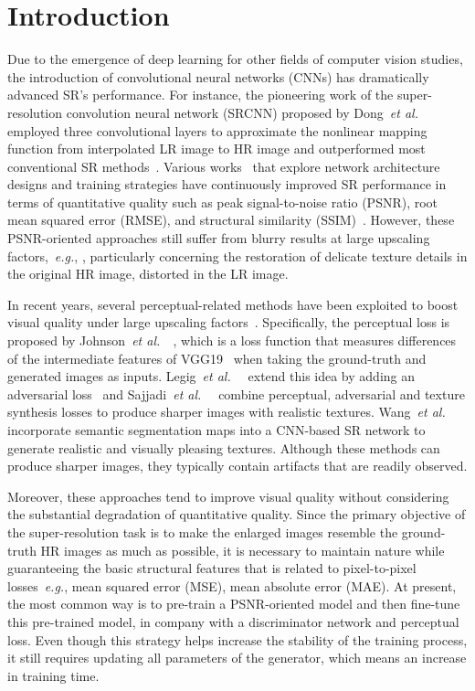 \documentclass[preprint]{elsarticle}
\newcommand{\etal}{\textit{et al.~}}
\newcommand{\eg}{\textit{e.g.}}
\begin{document}
\section{Introduction}

Due to the emergence of deep learning for other fields of computer vision studies, the introduction of convolutional neural networks (CNNs) has dramatically advanced SR's performance. For instance, the pioneering work of the super-resolution convolution neural network (SRCNN) proposed by Dong~\etal~\cite{SRCNN,SRCNN-Ex} employed three convolutional layers to approximate the nonlinear mapping function from interpolated LR image to HR image and outperformed most conventional SR methods~\cite{PCPE-MDSISR_IS16,Hadamard_IS18}. Various works~\cite{FSRCNN,VDSR,DRCN,ESPCN,DRRN,LapSRN,EDSR,MemNet,SRDenseNet,IDN,RDN,RCAN} that explore network architecture designs and training strategies have continuously improved SR performance in terms of quantitative quality such as peak signal-to-noise ratio (PSNR), root mean squared error (RMSE), and structural similarity (SSIM)~\cite{SSIM}. However, these PSNR-oriented approaches still suffer from blurry results at large upscaling factors,~\eg, , particularly concerning the restoration of delicate texture details in the original HR image, distorted in the LR image.

In recent years, several perceptual-related methods have been exploited to boost visual quality under large upscaling factors~\cite{Perceptual-loss,SRGAN,EnhanceNet,CX,ESRGAN}. Specifically, the perceptual loss is proposed by Johnson~\etal~\cite{Perceptual-loss}, which is a loss function that measures differences of the intermediate features of VGG19~\cite{VGG19} when taking the ground-truth and generated images as inputs. Legig~\etal~\cite{SRGAN} extend this idea by adding an adversarial loss~\cite{GAN} and Sajjadi~\etal~\cite{EnhanceNet} combine perceptual, adversarial and texture synthesis losses to produce sharper images with realistic textures. Wang~\etal~\cite{SFTGAN} incorporate semantic segmentation maps into a CNN-based SR network to generate realistic and visually pleasing textures. Although these methods can produce sharper images, they typically contain artifacts that are readily observed. 

Moreover, these approaches tend to improve visual quality without considering the substantial degradation of quantitative quality. Since the primary objective of the super-resolution task is to make the enlarged images resemble the ground-truth HR images as much as possible, it is necessary to maintain nature while guaranteeing the basic structural features that is related to pixel-to-pixel losses~\eg, mean squared error (MSE), mean absolute error (MAE). At present, the most common way is to pre-train a PSNR-oriented model and then fine-tune this pre-trained model, in company with a discriminator network and perceptual loss. Even though this strategy helps increase the stability of the training process, it still requires updating all parameters of the generator, which means an increase in training time.
\end{document}
